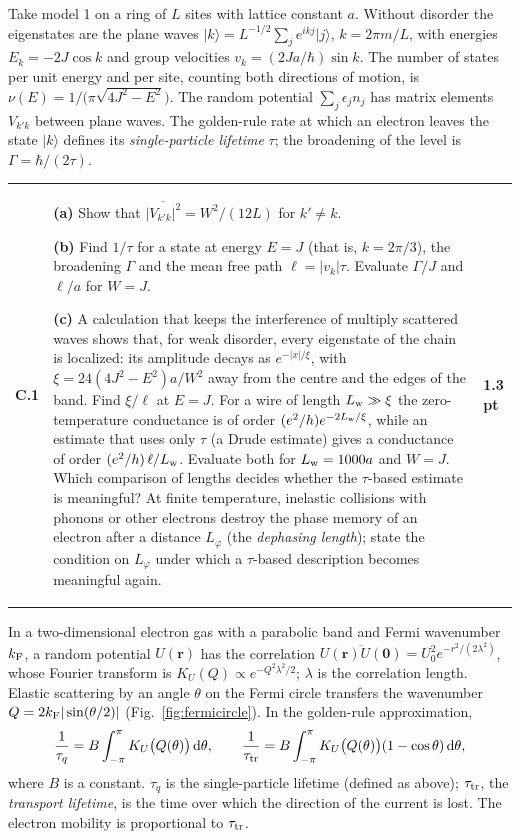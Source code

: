 \documentclass[11pt,a4paper]{article}
\makeatletter
\newcommand{\ket}[1]{\lvert #1\rangle}
\newcommand{\dd}{\mathrm d}
\newcommand{\avg}[1]{\overline{#1}}
\newcommand{\parttitle}[3]{\par\Needspace{8\baselineskip}\vspace{6pt}{\large\bfseries\color{ink}Part #1. #2\hfill\normalsize(#3 points)}\par\vspace{2pt}}
\newcommand{\question}[3]{\begin{tcolorbox}[enhanced,colback=white,colframe=rulegray,boxrule=0.5pt,arc=0pt,left=7pt,right=7pt,top=7pt,bottom=7pt,before skip=9pt,after skip=9pt]\begin{tabularx}{\linewidth}{@{}>{\bfseries}p{10mm}X>{\raggedleft\arraybackslash}p{13mm}@{}}#1&#3&\textbf{#2 pt}\end{tabularx}\end{tcolorbox}}
\makeatother
\begin{document}
\parttitle{C}{From correlations to rates}{3.2}
Take model 1 on a ring of $L$ sites with lattice constant $a$. Without disorder the eigenstates are the plane waves $\ket k=L^{-1/2}\sum_je^{ikj}\ket j$, $k=2\pi m/L$, with energies $E_k=-2J\cos k$ and group velocities $v_k=(2Ja/\hbar)\sin k$. The number of states per unit energy and per site, counting both directions of motion, is $\nu(E)=1/\big(\pi\sqrt{4J^2-E^2}\big)$. The random potential $\sum_j\epsilon_jn_j$ has matrix elements $V_{k'k}$ between plane waves. The golden-rule rate at which an electron leaves the state $\ket k$ defines its \emph{single-particle lifetime} $\tau$; the broadening of the level is $\Gamma=\hbar/(2\tau)$.

\question{C.1}{1.3}{\textbf{(a)} Show that $\avg{|V_{k'k}|^2}=W^2/(12L)$ for $k'\neq k$.\par
\textbf{(b)} Find $1/\tau$ for a state at energy $E=J$ (that is, $k=2\pi/3$), the broadening $\Gamma$ and the mean free path $\ell=|v_k|\tau$. Evaluate $\Gamma/J$ and $\ell/a$ for $W=J$.\par
\textbf{(c)} A calculation that keeps the interference of multiply scattered waves shows that, for weak disorder, every eigenstate of the chain is localized: its amplitude decays as $e^{-|x|/\xi}$, with $\xi=24(4J^2-E^2)a/W^2$ away from the centre and the edges of the band. Find $\xi/\ell$ at $E=J$. For a wire of length $L_{\rm w}\gg\xi$ the zero-temperature conductance is of order $(e^2/h)e^{-2L_{\rm w}/\xi}$, while an estimate that uses only $\tau$ (a Drude estimate) gives a conductance of order $(e^2/h)\,\ell/L_{\rm w}$. Evaluate both for $L_{\rm w}=1000a$ and $W=J$. Which comparison of lengths decides whether the $\tau$-based estimate is meaningful? At finite temperature, inelastic collisions with phonons or other electrons destroy the phase memory of an electron after a distance $L_\varphi$ (the \emph{dephasing length}); state the condition on $L_\varphi$ under which a $\tau$-based description becomes meaningful again.}

In a two-dimensional electron gas with a parabolic band and Fermi wavenumber $k_{\rm F}$, a random potential $U(\bm r)$ has the correlation $\avg{U(\bm r)U(\bm 0)}=U_0^2e^{-r^2/(2\lambda^2)}$, whose Fourier transform is $K_U(Q)\propto e^{-Q^2\lambda^2/2}$; $\lambda$ is the correlation length. Elastic scattering by an angle $\theta$ on the Fermi circle transfers the wavenumber $Q=2k_{\rm F}|\sin(\theta/2)|$ (Fig.~\ref{fig:fermicircle}). In the golden-rule approximation,
\[
\frac1{\tau_q}=B\int_{-\pi}^{\pi}K_U\big(Q(\theta)\big)\,\dd\theta,\qquad
\frac1{\tau_{\rm tr}}=B\int_{-\pi}^{\pi}K_U\big(Q(\theta)\big)(1-\cos\theta)\,\dd\theta,
\]
where $B$ is a constant. $\tau_q$ is the single-particle lifetime (defined as above); $\tau_{\rm tr}$, the \emph{transport lifetime}, is the time over which the direction of the current is lost. The electron mobility is proportional to $\tau_{\rm tr}$.
\end{document}
